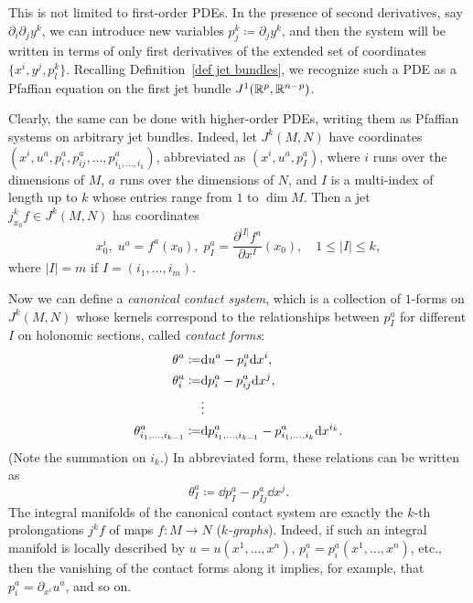 \begin{rem}
    This is not limited to first-order PDEs. In the presence of second derivatives, say $\partial_i\partial_j y^k$, we can  introduce new variables $p_j^k\coloneqq \partial_j y^k$, and then the system will be written in terms of only first derivatives of the extended set of coordinates $\{x^i,y^j,p^k_l\}$. Recalling Definition~\ref{def jet bundles}, we recognize such a PDE as a Pfaffian equation on the first jet bundle $J^1(\mathbb{R}^p,\mathbb{R}^{n-p})$. 
    
    Clearly, the same can be done with higher-order PDEs, writing them as Pfaffian systems on arbitrary jet bundles. Indeed, let $J^k(M,N)$ have coordinates $(x^i,u^a,p_i^a,p_{ij}^a,\ldots,p_{i_1,\ldots,i_k}^a)$, abbreviated as $(x^i,u^a,p_I^a)$, where $i$ runs over the dimensions of $M$, $a$ runs over the dimensions of $N$, and $I$ is a multi-index of length up to $k$ whose entries range from $1$ to $\dim M$. Then a jet $j_{x_0}^k f\in J^k(M,N)$ has coordinates 
    \[x^i_0,\; u^a=f^a(x_0),\; p_I^a=\frac{\partial^{|I|}f^a}{\partial x^I}(x_0),\quad 1\leq |I|\leq k,\]
    where $|I|=m$ if $I=(i_1,\ldots,i_m)$.

    Now we can define a \emph{canonical contact system}, which is a collection of $1$-forms on $J^k(M,N)$ whose kernels correspond to the relationships between $p_I^a$ for different $I$ on holonomic sections, called \emph{contact forms}:
    \begin{align}
        \theta^a\coloneqq &{\mathrm{d}} u^a-p_i^a{\mathrm{d}} x^i,\notag\\
        \theta^a_i\coloneqq& {\mathrm{d}} p^a_i-p_{ij}^a{\mathrm{d}} x^j,\notag\\
        &\vdots \\
        \theta^a_{i_1,\ldots,i_{k-1}}\coloneqq &{\mathrm{d}} p^a_{i_1,\ldots,i_{k-1}}-p_{i_1,\ldots,i_k}^a{\mathrm{d}} x^{i_k}.\notag
    \end{align}
    (Note the summation on $i_k$.) In abbreviated form, these relations can be written as 
    \[\theta^a_I\coloneqq \dd p_I^a-p^a_{Ij}\dd x^j.\]
    The integral manifolds of the canonical contact system are exactly the $k$-th prolongations $j^k f$ of maps $f:M\to N$ (\emph{$k$-graphs}). Indeed, if such an integral manifold is locally described by $u=u(x^1,\ldots,x^n)$, $p_i^a=p_i^a(x^1,\ldots,x^n)$,  etc., then the vanishing of the contact forms along it implies, for example, that $p_i^a=\partial_{x^i}u^a$, and so on. 


\end{rem}
